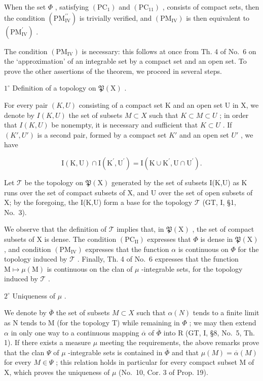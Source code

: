 When the set \(\Phi\) , satisfying \((\mathrm{PC}_{1})\) and \((\mathrm{PC}_{11})\) , consists of compact sets, then the condition \((\mathrm{PM}_{\mathrm{IV}}^{\prime \prime})\) is trivially verified, and \((\mathrm{PM}_{\mathrm{IV}})\) is then equivalent to \((\mathrm{PM}_{\mathrm{IV}}^{\prime})\) .

The condition \((\mathrm{PM}_{\mathrm{IV}})\) is necessary: this follows at once from Th. 4 of No.~6 on the `approximation' of an integrable set by a compact set and an open set. To prove the other assertions of the theorem, we proceed in several steps.

\(1^{\circ}\) Definition of a topology on \(\mathfrak{P}(\mathrm{X})\) .

For every pair \((K,U)\) consisting of a compact set K and an open set U in X, we denote by \(I(K,U)\) the set of subsets \(M \subset X\) such that \(K \subset M \subset U\) ; in order that \(I(K,U)\) be nonempty, it is necessary and sufficient that \(K \subset U\) . If \((K',U')\) is a second pair, formed by a compact set \(K'\) and an open set \(U'\) , we have

\[
\mathrm{I} (\mathrm{K}, \mathrm{U}) \cap \mathrm{I} (\mathrm{K} ^ {\prime}, \mathrm{U} ^ {\prime}) = \mathrm{I} (\mathrm{K} \cup \mathrm{K} ^ {\prime}, \mathrm{U} \cap \mathrm{U} ^ {\prime}).
\]

Let \(\mathcal{T}\) be the topology on \(\mathfrak{P}(\mathrm{X})\) generated by the set of subsets I(K,U) as K runs over the set of compact subsets of X, and U over the set of open subsets of X; by the foregoing, the I(K,U) form a base for the topology \(\mathcal{T}\) (GT, I, §1, No.~3).

We observe that the definition of \(\mathcal{T}\) implies that, in \(\mathfrak{P}(\mathrm{X})\) , the set of compact subsets of \(\mathrm{X}\) is dense. The condition \((\mathrm{PC}_{\mathrm{II}})\) expresses that \(\Phi\) is dense in \(\mathfrak{P}(\mathrm{X})\) , and condition \((\mathrm{PM}_{\mathrm{IV}})\) expresses that the function \(\alpha\) is continuous on \(\Phi\) for the topology induced by \(\mathcal{T}\) . Finally, Th. 4 of No.~6 expresses that the function \(\mathrm{M} \mapsto \mu(\mathrm{M})\) is continuous on the clan of \(\mu\) -integrable sets, for the topology induced by \(\mathcal{T}\) .

\(2^{\circ}\) Uniqueness of \(\mu\) .

We denote by \(\overline{\Phi}\) the set of subsets \(M \subset X\) such that \(\alpha(N)\) tends to a finite limit as N tends to M (for the topology T) while remaining in \(\Phi\) ; we may then extend \(\alpha\) in only one way to a continuous mapping \(\overline{\alpha}\) of \(\overline{\Phi}\) into R (GT, I, §8, No.~5, Th. 1). If there exists a measure \(\mu\) meeting the requirements, the above remarks prove that the clan \(\Psi\) of \(\mu\) -integrable sets is contained in \(\overline{\Phi}\) and that \(\mu(M) = \overline{\alpha}(M)\) for every \(M \in \Psi\) ; this relation holds in particular for every compact subset M of X, which proves the uniqueness of \(\mu\) (No.~10, Cor. 3 of Prop. 19).

